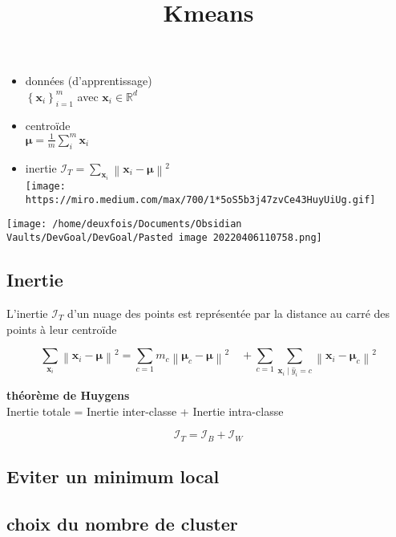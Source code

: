 \documentclass[
]{article}
\title{Kmeans}
\author{}
\date{}
\providecommand{\tightlist}{%
  \setlength{\itemsep}{0pt}\setlength{\parskip}{0pt}}
\begin{document}
\maketitle

\begin{itemize}
\tightlist
\item
  données (d'apprentissage)\\
  {\(\left\{ \mathbf{x}_{i} \right\}_{i = 1}^{m}\)} avec
  {\(\mathbf{x}_{i} \in \mathbb{R}^{d}\)}
\item
  centroïde\\
  {\(\mathbf{\mu} = \frac{1}{m}\sum\limits_{i}^{m}\mathbf{x}_{i}\)}
\item
  inertie
  {\(\mathcal{I}_{T} = \sum\limits_{\mathbf{x}_{i}}\left\| \mathbf{x}_{i} - \mathbf{\mu} \right\|^{2}\)}\\
  \texttt{[image: https://miro.medium.com/max/700/1*5oS5b3j47zvCe43HuyUiUg.gif]}
\end{itemize}

\texttt{[image: /home/deuxfois/Documents/Obsidian Vaults/DevGoal/DevGoal/Pasted image 20220406110758.png]}

\hypertarget{inertie}{%
\subsection{Inertie}\label{inertie}}

L'inertie {\(\mathcal{I}_{T}\)} d'un nuage des points est représentée
par la distance au carré des points à leur centroïde

\[\sum\limits_{\mathbf{x}_{i}}\left\| \mathbf{x}_{i} - \mathbf{\mu} \right\|^{2} = \sum\limits_{c = 1}m_{c}\left\| \mathbf{\mu}_{c} - \mathbf{\mu} \right\|^{2}\quad + \sum\limits_{c = 1}\sum\limits_{\mathbf{x}_{i} \mid {\hat{y}}_{i} = c}\left\| \mathbf{x}_{i} - \mathbf{\mu}_{c} \right\|^{2}\]

\textbf{théorème de Huygens}\\
Inertie totale = Inertie inter-classe + Inertie intra-classe

\[\mathcal{I}_{T} = \mathcal{I}_{B} + \mathcal{I}_{W}\]

\hypertarget{eviter-un-minimum-local}{%
\subsection{Eviter un minimum local}\label{eviter-un-minimum-local}}

\hypertarget{choix-du-nombre-de-cluster}{%
\subsection{choix du nombre de
cluster}\label{choix-du-nombre-de-cluster}}
\end{document}
